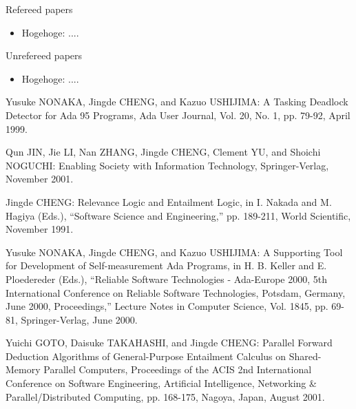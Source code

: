 \documentclass[12pt,epsf]{report}
\begin{document}
{{{{\begin{list}%
 {} %
 {} %
 \item Refereed papers
       \begin{itemize}
	\item Hogehoge: ....
       \end{itemize}
 \item Unrefereed papers
       \begin{itemize}
	\item Hogehoge: ....
       \end{itemize}
\end{list}

\newpage

%
%

\begin{thebibliography}{99}

Yusuke NONAKA, Jingde CHENG, and Kazuo USHIJIMA: A Tasking Deadlock
        Detector for Ada 95 Programs, Ada User Journal, Vol. 20, No. 1,
        pp. 79-92, April 1999.

Qun JIN, Jie LI, Nan ZHANG, Jingde CHENG, Clement YU, and Shoichi
        NOGUCHI: Enabling Society with Information Technology,
        Springer-Verlag, November 2001.

Jingde CHENG: Relevance Logic and Entailment Logic, in I. Nakada and
        M. Hagiya (Eds.), ``Software Science and Engineering,''
        pp. 189-211, World Scientific, November 1991.

Yusuke NONAKA, Jingde CHENG, and Kazuo USHIJIMA: A Supporting Tool for
        Development of Self-measurement Ada Programs, in H. B. Keller
        and E. Ploedereder (Eds.), ``Reliable Software Technologies -
        Ada-Europe 2000, 5th International Conference on Reliable
        Software Technologies, Potsdam, Germany, June 2000,
        Proceedings,'' Lecture Notes in Computer Science, Vol. 1845,
        pp. 69-81, Springer-Verlag, June 2000.

Yuichi GOTO, Daisuke TAKAHASHI, and Jingde CHENG: Parallel Forward
        Deduction Algorithms of General-Purpose Entailment Calculus on
        Shared-Memory Parallel Computers, Proceedings of the ACIS 2nd
        International Conference on Software Engineering, Artificial
        Intelligence, Networking \& Parallel/Distributed Computing,
        pp. 168-175, Nagoya, Japan, August 2001.



\end{thebibliography}}}}}
\end{document}
